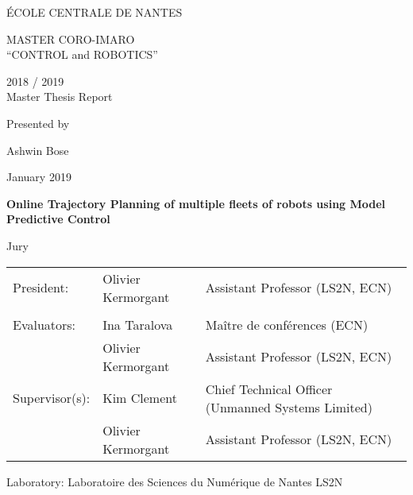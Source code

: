 \thispagestyle{empty}

\def\lskip{\vspace{0.5cm}}



\begin{center}
	ÉCOLE CENTRALE DE NANTES
\end{center}
\vspace{2cm}

\begin{center} \large\sc MASTER CORO-IMARO\\ \normalsize{``CONTROL and ROBOTICS''} \end{center}



\begin{center}
	2018 / 2019\\
	\lskip
	Master Thesis Report
	\lskip
	
	Presented by \lskip 
	
	Ashwin Bose \lskip
	
	January 2019 \lskip\lskip
	
	{\Large \textbf{Online Trajectory Planning of multiple fleets of robots using Model Predictive Control}}
	
	\vfill

Jury \lskip
		
	\end{center}
	


\begin{tabular}{p{3cm}p{7cm}p{5cm} }
 President: &Olivier Kermorgant  & Assistant Professor (LS2N, ECN) \\ & & \\ 
 Evaluators: & Ina Taralova & Maître de conférences (ECN) \\
			&Olivier Kermorgant & Assistant Professor (LS2N, ECN)\\ 
  Supervisor(s):  & Kim Clement & Chief Technical Officer (Unmanned Systems Limited) \\
		  &Olivier Kermorgant & Assistant Professor (LS2N, ECN)\\
\end{tabular}

\lskip

\begin{flushleft}
 Laboratory: Laboratoire des Sciences du Numérique de Nantes LS2N
\end{flushleft}

\newpage
\thispagestyle{empty}
\null
\newpage
\addtocounter{page}{-1}
\pagestyle{fancy}
